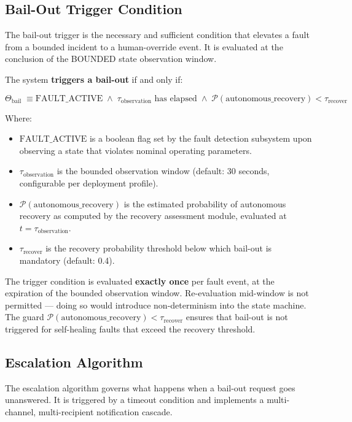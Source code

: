 \subsection{Bail-Out Trigger Condition}

The bail-out trigger is the necessary and sufficient condition that elevates a fault from a bounded incident to a human-override event. It is evaluated at the conclusion of the BOUNDED state observation window.

\begin{definition}
\label{def:bailout-trigger}
The system \textbf{triggers a bail-out} if and only if:

\[
\Theta_{\text{bail}} \;\equiv \text{FAULT\_ACTIVE} \;\land\; \tau_{\text{observation}} \text{ has elapsed} \;\land\; \mathcal{P}(\text{autonomous\_recovery}) < \tau_{\text{recover}}
\]

Where:
\begin{itemize}
  \item $\text{FAULT\_ACTIVE}$ is a boolean flag set by the fault detection subsystem upon observing a state that violates nominal operating parameters.
  \item $\tau_{\text{observation}}$ is the bounded observation window (default: 30 seconds, configurable per deployment profile).
  \item $\mathcal{P}(\text{autonomous\_recovery})$ is the estimated probability of autonomous recovery as computed by the recovery assessment module, evaluated at $t = \tau_{\text{observation}}$.
  \item $\tau_{\text{recover}}$ is the recovery probability threshold below which bail-out is mandatory (default: 0.4).
\end{itemize}
\end{definition}

The trigger condition is evaluated \textbf{exactly once} per fault event, at the expiration of the bounded observation window. Re-evaluation mid-window is not permitted — doing so would introduce non-determinism into the state machine. The guard $\mathcal{P}(\text{autonomous\_recovery}) < \tau_{\text{recover}}$ ensures that bail-out is not triggered for self-healing faults that exceed the recovery threshold.

\subsection{Escalation Algorithm}

The escalation algorithm governs what happens when a bail-out request goes unanswered. It is triggered by a timeout condition and implements a multi-channel, multi-recipient notification cascade.

